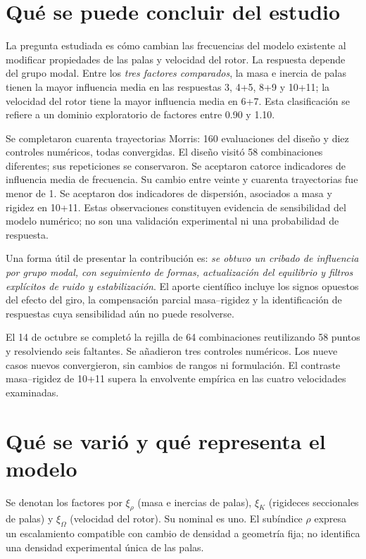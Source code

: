 \section{Qué se puede concluir del estudio}
La pregunta estudiada es cómo cambian las frecuencias del modelo existente al modificar propiedades de las palas y velocidad del rotor. La respuesta depende del grupo modal. Entre los \emph{tres factores comparados}, la masa e inercia de palas tienen la mayor influencia media en las respuestas 3, 4+5, 8+9 y 10+11; la velocidad del rotor tiene la mayor influencia media en 6+7. Esta clasificación se refiere a un dominio exploratorio de factores entre 0.90 y 1.10.

Se completaron cuarenta trayectorias Morris: 160 evaluaciones del diseño y diez controles numéricos, todas convergidas. El diseño visitó 58 combinaciones diferentes; sus repeticiones se conservaron. Se aceptaron catorce indicadores de influencia media de frecuencia. Su cambio entre veinte y cuarenta trayectorias fue menor de 1\pct. Se aceptaron dos indicadores de dispersión, asociados a masa y rigidez en 10+11. Estas observaciones constituyen evidencia de sensibilidad del modelo numérico; no son una validación experimental ni una probabilidad de respuesta.

Una forma útil de presentar la contribución es: \emph{se obtuvo un cribado de influencia por grupo modal, con seguimiento de formas, actualización del equilibrio y filtros explícitos de ruido y estabilización}. El aporte científico incluye los signos opuestos del efecto del giro, la compensación parcial masa--rigidez y la identificación de respuestas cuya sensibilidad aún no puede resolverse.


El 14 de octubre se completó la rejilla de 64 combinaciones reutilizando 58 puntos y resolviendo seis faltantes. Se añadieron tres controles numéricos. Los nueve casos nuevos convergieron, sin cambios de rangos ni formulación. El contraste masa--rigidez de 10+11 supera la envolvente empírica en las cuatro velocidades examinadas.

\section{Qué se varió y qué representa el modelo}
Se denotan los factores por $\xi_\rho$ (masa e inercias de palas), $\xi_K$ (rigideces seccionales de palas) y $\xi_\Omega$ (velocidad del rotor). Su nominal es uno. El subíndice $\rho$ expresa un escalamiento compatible con cambio de densidad a geometría fija; no identifica una densidad experimental única de las palas.

